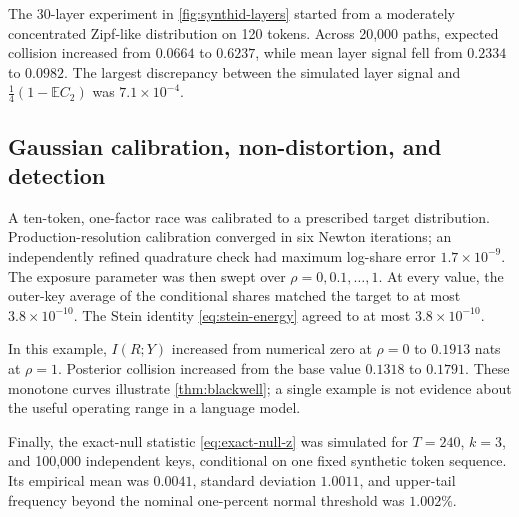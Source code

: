 \documentclass[11pt]{article}
\theoremstyle{definition}
\theoremstyle{remark}
\newcommand{\E}{\mathbb{E}}
\begin{document}
The 30-layer experiment in \cref{fig:synthid-layers} started from a moderately concentrated Zipf-like distribution on 120 tokens. Across 20,000 paths, expected collision increased from $0.0664$ to $0.6237$, while mean layer signal fell from $0.2334$ to $0.0982$. The largest discrepancy between the simulated layer signal and $\tfrac14(1-\E C_2)$ was $7.1\times10^{-4}$.

\subsection{Gaussian calibration, non-distortion, and detection}

A ten-token, one-factor race was calibrated to a prescribed target distribution. Production-resolution calibration converged in six Newton iterations; an independently refined quadrature check had maximum log-share error $1.7\times10^{-9}$. The exposure parameter was then swept over $\rho=0,0.1,\ldots,1$. At every value, the outer-key average of the conditional shares matched the target to at most $3.8\times10^{-10}$. The Stein identity \eqref{eq:stein-energy} agreed to at most $3.8\times10^{-10}$.

In this example, $I(R;Y)$ increased from numerical zero at $\rho=0$ to $0.1913$ nats at $\rho=1$. Posterior collision increased from the base value $0.1318$ to $0.1791$. These monotone curves illustrate \cref{thm:blackwell}; a single example is not evidence about the useful operating range in a language model.

Finally, the exact-null statistic \eqref{eq:exact-null-z} was simulated for $T=240$, $k=3$, and 100,000 independent keys, conditional on one fixed synthetic token sequence. Its empirical mean was $0.0041$, standard deviation $1.0011$, and upper-tail frequency beyond the nominal one-percent normal threshold was $1.002\%$.
\end{document}
